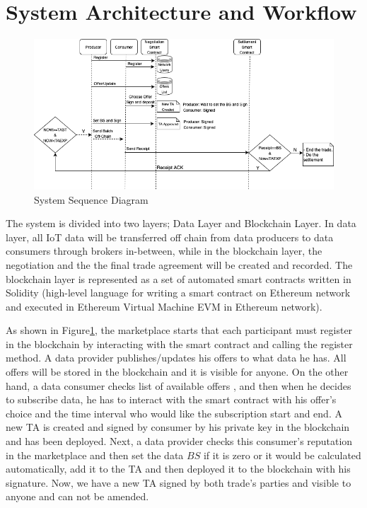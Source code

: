 \documentclass[letterpaper, 10 pt, conference]{ieeeconf}  %
\begin{document}
\section{System Architecture and Workflow} \label{Arch}

\begin{figure}
  \caption{System Sequence Diagram}
  \label{SSD}
  \includegraphics[width=.7\textwidth]{SystemArchWithBackground}
  \centering
\end{figure}

The system is divided into two layers; Data Layer and Blockchain Layer. In data layer, all IoT data will be transferred off chain from data producers to data consumers through brokers in-between, while in the blockchain layer, the negotiation and the the final trade agreement will be created and recorded. The blockchain layer is represented as a set of automated smart contracts written in Solidity (high-level language for writing a smart contract on Ethereum network and executed in Ethereum Virtual Machine EVM in Ethereum network).

As shown in Figure\ref{SSD}, the marketplace starts that each participant must register in the blockchain by interacting with the smart contract and calling the register method. A data provider publishes/updates his offers to what data he has. All offers will be stored in the blockchain and it is visible for anyone. On the other hand, a data consumer checks list of available offers , and then when he decides to subscribe data, he has to interact with the smart contract with his offer’s choice and the time interval who would like the subscription start and end. A new TA is created and signed by consumer by his private key in the blockchain and has been deployed. Next, a data provider checks this consumer’s reputation in the marketplace and then set the data $BS$ if it is zero or it would be calculated automatically, add it to the TA and then deployed it to the blockchain with his signature. Now, we have a new TA signed by both trade’s parties and visible to anyone and can not be amended. 
\end{document}
